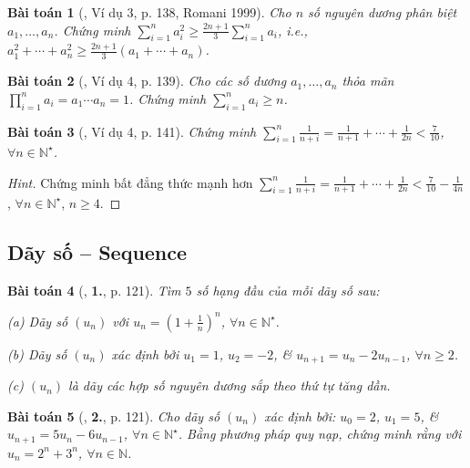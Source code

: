 \documentclass{article}
\numberwithin{equation}{section}
\newtheorem{baitoan}{Bài toán}[section]
\begin{document}
\begin{baitoan}[\cite{TL_chuyen_Toan_Giai_Tich_12}, Ví dụ 3, p. 138, Romani 1999]
	Cho $n$ số nguyên dương phân biệt $a_1,\ldots,a_n$. Chứng minh $\sum_{i=1}^n a_i^2\ge\frac{2n + 1}{3}\sum_{i=1}^n a_i$, i.e., $a_1^2 + \cdots + a_n^2\ge\frac{2n + 1}{3}(a_1 + \cdots + a_n)$.
\end{baitoan}

\begin{baitoan}[\cite{TL_chuyen_Toan_Giai_Tich_12}, Ví dụ 4, p. 139]
	Cho các số dương $a_1,\ldots,a_n$ thỏa mãn $\prod_{i=1}^n a_i = a_1\cdots a_n = 1$. Chứng minh $\sum_{i=1}^n a_i\ge n$.
\end{baitoan}

\begin{baitoan}[\cite{TL_chuyen_Toan_Giai_Tich_12}, Ví dụ 4, p. 141]
	Chứng minh $\sum_{i=1}^n \frac{1}{n + i} = \frac{1}{n + 1} + \cdots + \frac{1}{2n} < \frac{7}{10}$, $\forall n\in\mathbb{N}^\star$.
\end{baitoan}

\begin{proof}[Hint]
	Chứng minh bất đẳng thức mạnh hơn $\sum_{i=1}^n \frac{1}{n + i} = \frac{1}{n + 1} + \cdots + \frac{1}{2n} < \frac{7}{10} - \frac{1}{4n}$, $\forall n\in\mathbb{N}^\star$, $n\ge 4$.
\end{proof}


\subsection{Dãy số -- Sequence}

\begin{baitoan}[\cite{TL_chuyen_Toan_Dai_So_Giai_Tich_11}, \textbf{1.}, p. 121]
	Tìm $5$ số hạng đầu của mỗi dãy số sau:
	\begin{enumerate*}
		\item[(a)] Dãy số $(u_n)$ với $u_n = \left(1 + \frac{1}{n}\right)^n$, $\forall n\in\mathbb{N}^\star$.
		\item[(b)] Dãy số $(u_n)$ xác định bởi $u_1 = 1$, $u_2 = -2$, \& $u_{n+1} = u_n - 2u_{n-1}$, $\forall n\ge 2$.
		\item[(c)] $(u_n)$ là dãy các hợp số nguyên dương sắp theo thứ tự tăng dần.
	\end{enumerate*}
\end{baitoan}

\begin{baitoan}[\cite{TL_chuyen_Toan_Dai_So_Giai_Tich_11}, \textbf{2.}, p. 121]
	Cho dãy số $(u_n)$ xác định bởi: $u_0 = 2$, $u_1 = 5$, \& $u_{n+1} = 5u_n - 6u_{n-1}$, $\forall n\in\mathbb{N}^\star$. Bằng phương pháp quy nạp, chứng minh rằng với $u_n = 2^n + 3^n$, $\forall n\in\mathbb{N}$.
\end{baitoan}
\end{document}
